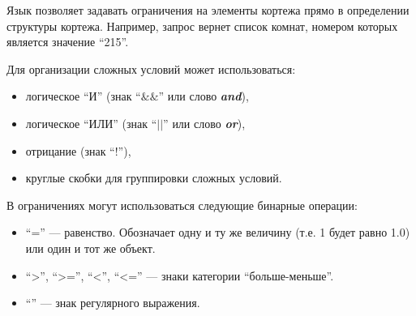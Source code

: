 Язык позволяет задавать ограничения на элементы кортежа прямо в определении структуры кортежа.
Например, запрос
вернет список комнат, номером которых является значение ``215''.

Для организации сложных условий может использоваться: 
    \begin{itemize}\addtolength{\itemsep}{-0.7\baselineskip}
	\item логическое ``И'' (знак ``$\&\&$'' или слово {\itshape{\bfseries and}}),
	\item логическое ``ИЛИ'' (знак ``$||$'' или слово {\itshape{\bfseries or}}),
	\item отрицание (знак ``!''),
	\item круглые скобки для группировки сложных условий.
    \end{itemize}

В ограничениях могут использоваться следующие бинарные операции:
    \begin{itemize}\addtolength{\itemsep}{-0.7\baselineskip}
	\item ``='' --- равенство. 
		Обозначает одну и ту же величину 
		(т.е. 1 будет равно 1.0) или один и тот же объект.
	\item ``>'', ``>='', ``<'', ``<='' --- знаки категории ``больше-меньше''. 
	\item ``'' --- знак регулярного выражения. 
    \end{itemize}

